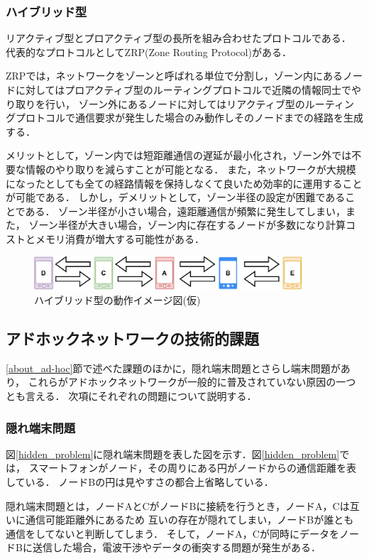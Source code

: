 \documentclass[a4paper, 11pt]{ltjsarticle}
\begin{document}
\subsubsection{ハイブリッド型}
リアクティブ型とプロアクティブ型の長所を組み合わせたプロトコルである．
代表的なプロトコルとしてZRP(Zone Routing Protocol)\cite{1574231874891177344}がある．

ZRPでは，ネットワークをゾーンと呼ばれる単位で分割し，ゾーン内にあるノードに対してはプロアクティブ型のルーティングプロトコルで近隣の情報同士でやり取りを行い，
ゾーン外にあるノードに対してはリアクティブ型のルーティングプロトコルで通信要求が発生した場合のみ動作しそのノードまでの経路を生成する．

メリットとして，ゾーン内では短距離通信の遅延が最小化され，ゾーン外では不要な情報のやり取りを減らすことが可能となる．
また，ネットワークが大規模になったとしても全ての経路情報を保持しなくて良いため効率的に運用することが可能である．
しかし，デメリットとして，ゾーン半径の設定が困難であることである．
ゾーン半径が小さい場合，遠距離通信が頻繁に発生してしまい，また，
ゾーン半径が大きい場合，ゾーン内に存在するノードが多数になり計算コストとメモリ消費が増大する可能性がある．

\begin{figure}[H]
  \centering
  \includegraphics[width=100mm]{proactive_model.pdf}
  \caption{ハイブリッド型の動作イメージ図(仮)}
  \label{hybrid}
\end{figure}

\subsection{アドホックネットワークの技術的課題}
\ref{about_ad-hoc}節で述べた課題のほかに，隠れ端末問題とさらし端末問題があり，
これらがアドホックネットワークが一般的に普及されていない原因の一つとも言える\cite{松井_進2012KJ00008330022}．
次項にそれぞれの問題について説明する．
\subsubsection{隠れ端末問題}
図\ref{hidden_problem}に隠れ端末問題を表した図を示す．図\ref{hidden_problem}では，
スマートフォンがノード，その周りにある円がノードからの通信距離を表している．
ノードBの円は見やすさの都合上省略している．

隠れ端末問題とは，ノードAとCがノードBに接続を行うとき，ノードA，Cは互いに通信可能距離外にあるため
互いの存在が隠れてしまい，ノードBが誰とも通信をしてないと判断してしまう．
そして，ノードA，Cが同時にデータをノードBに送信した場合，電波干渉やデータの衝突する問題が発生がある．
\end{document}
